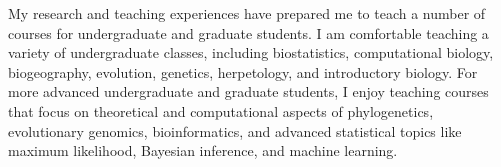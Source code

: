
My research and teaching experiences have prepared me to teach a number of
courses for undergraduate and graduate students.
I am comfortable teaching a variety of undergraduate classes, including
biostatistics,
computational biology,
biogeography,
evolution,
genetics,
herpetology,
and
introductory biology.
For more advanced undergraduate and graduate students, I enjoy teaching courses
that focus on theoretical and computational aspects of
phylogenetics,
evolutionary genomics,
bioinformatics,
and
advanced statistical topics like
maximum likelihood,
Bayesian inference,
and
machine learning.

